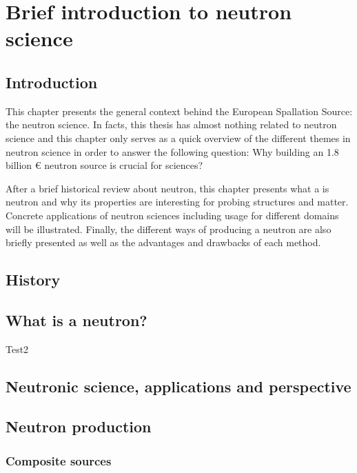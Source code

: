 \chapter{Brief introduction to neutron science}
\cleardoublepage

\minitoc

\section{Introduction}
\begin{refsection}
  \label{ch1:Introduction}
  This chapter presents the general context behind the European Spallation Source: the neutron science. In facts, this thesis has almost nothing related to neutron science and this chapter only serves as a quick overview of the different themes in neutron science in order to answer the following question: Why building an 1.8 billion € neutron source is crucial for sciences? 
 
  After a brief historical review about neutron, this chapter presents what a is neutron and why its properties are interesting for probing structures and matter. Concrete applications of neutron sciences including usage for different domains will be illustrated. Finally, the different ways of producing a neutron are also briefly presented as well as the advantages and drawbacks of each method.

	\section{History}

	\section{What is a neutron?}
	\label{ch1:sec:Neutron}
	Test2 \cite{osti_656719}


	\section{Neutronic science, applications and perspective}

  
  \section{Neutron production}
  \subsection{Composite sources}

\end{refsection}

